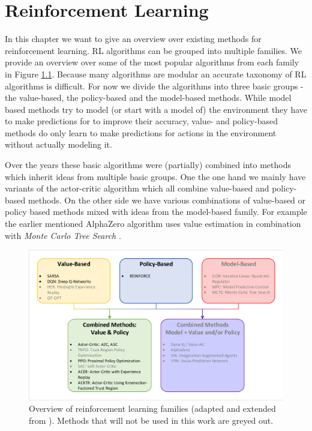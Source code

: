 \chapter{Reinforcement Learning} \label{chp: RLOverview}
In this chapter we want to give an overview over existing methods for reinforcement learning. RL algorithms can be grouped into multiple families. We provide an overview over some of the most popular algorithms from each family in Figure \ref{fig:rl_families}. Because many algorithms are modular an accurate taxonomy of RL algorithms is difficult. For now we divide the algorithms into three basic groups - the value-based, the policy-based and the model-based methods. While model based methods try to model (or start with a model of) the environment they have to make predictions for to improve their accuracy, value- and policy-based methods do only learn to make predictions for actions in the environment without actually modeling it.

Over the years these basic algorithms were (partially) combined into methods which inherit ideas from multiple basic groups. One the one hand we mainly have variants of the actor-critic algorithm which all combine value-based and policy-based methods. On the other side we have various combinations of value-based or policy based methods mixed with ideas from the model-based family. For example the earlier mentioned AlphaZero algorithm uses value estimation in combination with \textit{Monte Carlo Tree Search} \cite{silver2017mastering}. 

\begin{figure}[ht]
    
  \begin{center}
      \includegraphics[clip, trim=10px 10px 10px 10px, width=0.95\columnwidth]{figures/rl/rl_families.pdf}
  \end{center}
  
  \caption[Overview of RL Families]{Overview of reinforcement learning families (adapted and extended from \cite{foundations2019graesser}). Methods that will not be used in this work are greyed out.}
  \label{fig:rl_families}
\end{figure}

